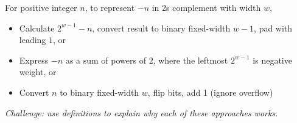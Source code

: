 
For positive integer $n$, to represent $-n$ in 
2s complement with width $w$,
\begin{itemize}
    \item Calculate $2^{w-1} - n$, convert 
    result to binary fixed-width $w-1$, pad 
    with leading $1$, or
    \item Express $-n$ as a sum of powers of $2$, 
    where the leftmost $2^{w-1}$ is negative weight, or
    \item Convert $n$ to binary fixed-width $w$, 
    flip bits, add 1 (ignore overflow)
\end{itemize}

{\it Challenge: use definitions to explain why
each of these approaches works.}